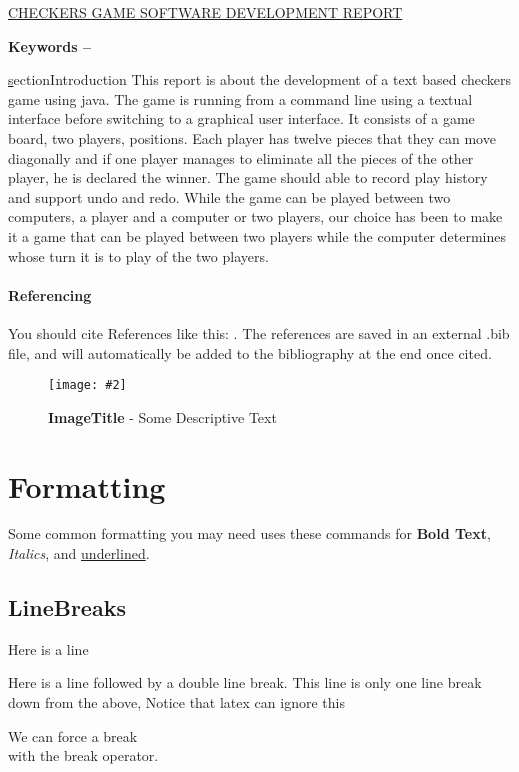 \documentclass[10pt, a4paper]{article}
\title{\mytitle}
\author{\myauthor\hspace{1em}\\\contact\\Edinburgh Napier University\hspace{0.5em}-\hspace{0.5em}\mymodule}
\date{}
\newcommand{\figuremacro}[5]{
    \begin{figure}[#1]
        \centering
        \texttt{[image: \#2]}
        \caption[#3]{\textbf{#3}#4}
        \label{fig:#2}
    \end{figure}
}
\begin{document}
    \underline{CHECKERS GAME SOFTWARE DEVELOPMENT REPORT}
    \begin{abstract}
        \lipsum[2]
    \end{abstract}
    
    \textbf{Keywords -- }{\mykeywords}
    
    \underline section{Introduction}
    This report is about the development of a text based checkers game using java. The game is running from a command line using a textual interface before switching to a graphical user interface. It consists of a game board, two players, positions. Each player has twelve pieces that they can move diagonally and if one player manages to eliminate all the pieces of the other player, he is declared the winner. The game should able to record play history and support undo and redo. While the game can be played between two computers, a player and a computer or two players, our choice has been to make it a game that can be played between two players while the computer determines whose turn it is to play of the two players.     
    \paragraph{Referencing}
    You should cite References like this: \cite{Keshav}. The references are saved in an external .bib file, and will automatically be added to the bibliography at the end once cited.
    
    \figuremacro{h}{placeholder}{ImageTitle}{ - Some Descriptive Text}{1.0}
	
	\section{Formatting}
	Some common formatting you may need uses these commands for \textbf{Bold Text}, \textit{Italics}, and \underline{underlined}.
	\subsection{LineBreaks}
	Here is a line
    
    Here is a line followed by a double line break.
	This line is only one line break down from the above, Notice that latex can ignore this
    
    We can force a break \\ with the break operator.
\end{document}
